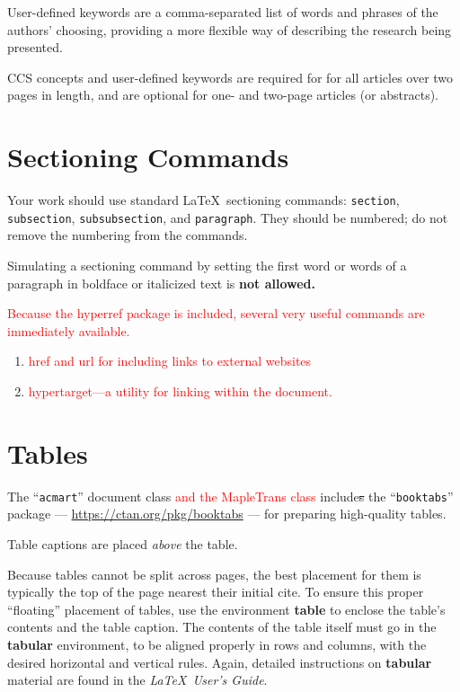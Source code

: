 \documentclass[anonymous,review,acmsmall,screen]{MapleTrans}
\newcommand{\strikethrough}[1]{\sout{#1}}
\begin{document}
User-defined keywords are a comma-separated list of words and phrases
of the authors' choosing, providing a more flexible way of describing
the research being presented.

CCS concepts and user-defined keywords are required for for all
articles over two pages in length, and are optional for one- and
two-page articles (or abstracts).

\section{Sectioning Commands}

Your work should use standard \LaTeX\ sectioning commands:
\verb|section|, \verb|subsection|, \verb|subsubsection|, and
\verb|paragraph|. They should be numbered; do not remove the numbering
from the commands.

Simulating a sectioning command by setting the first word or words of
a paragraph in boldface or italicized text is {\bfseries not allowed.}

\medskip\par
\textcolor{red}{Because the hyperref package is included, several very useful commands are immediately available.}
\begin{enumerate}
    \item \textcolor{red}{href and url for including links to external websites}
    \item \textcolor{red}{hypertarget---a utility for linking within the document.}
\end{enumerate}

\section{Tables}

The ``\verb|acmart|'' document class \textcolor{red}{and the MapleTrans class} include\strikethrough{s} the ``\verb|booktabs|''
package --- \url{https://ctan.org/pkg/booktabs} --- for preparing
high-quality tables.

Table captions are placed {\itshape above} the table.

Because tables cannot be split across pages, the best placement for
them is typically the top of the page nearest their initial cite.  To
ensure this proper ``floating'' placement of tables, use the
environment \textbf{table} to enclose the table's contents and the
table caption.  The contents of the table itself must go in the
\textbf{tabular} environment, to be aligned properly in rows and
columns, with the desired horizontal and vertical rules.  Again,
detailed instructions on \textbf{tabular} material are found in the
\textit{\LaTeX\ User's Guide}.
\end{document}
